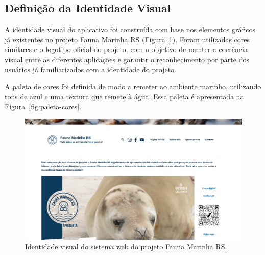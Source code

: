 \subsection{Definição da Identidade Visual}

A identidade visual do aplicativo foi construída com base nos elementos gráficos já 
existentes no projeto Fauna Marinha RS (Figura~\ref{fig:identidade-visual-web}). Foram 
utilizadas cores similares e o logotipo oficial do projeto, com o objetivo de manter a 
coerência visual entre as diferentes aplicações e garantir o reconhecimento por parte dos 
usuários já familiarizados com a identidade do projeto.

A paleta de cores foi definida de modo a remeter ao ambiente marinho, utilizando tons de 
azul e uma textura que remete à água. Essa paleta é apresentada na Figura~\ref{fig:paleta-cores}.

\begin{figure}[H]
    \centering
    \includegraphics[width=1\textwidth]{imagens/sistemaWebFaunaMar.png}
    \caption{Identidade visual do sistema web do projeto Fauna Marinha RS.}
    \label{fig:identidade-visual-web}
\end{figure}

